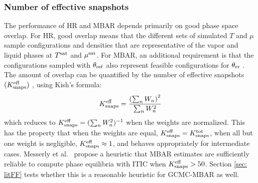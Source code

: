 \documentclass[journal=jced,manuscript=article]{achemso}
\begin{document}
\subsubsection{Number of effective snapshots} \label{sec: Keff}

The performance of HR and MBAR depends primarily on good phase space overlap. For HR, good overlap means that the different sets of simulated $T$ and $\mu$ sample configurations and densities that are representative of the vapor and liquid phases at $T^{\rm sat}$ and $\mu^{\rm sat}$. For MBAR, an additional requirement is that the configurations sampled with $\theta_{\rm ref}$ also represent feasible configurations for $\theta_{\rm rr}$ \cite{naden:jctc:2016,Postdoc_1}. The amount of overlap can be quantified by the number of effective snapshots $(K^{\rm eff}_{\rm snaps})$ \cite{Dybeck2016}, using Kish's formula:
\begin{eqnarray} \label{Neff_lit}
K^{\rm eff}_{\rm snaps} = \frac{\left(\sum_n W_n\right)^2}{\sum_n W_n^2}
\end{eqnarray}
which reduces to $K^{\rm eff}_{\rm snaps}  = (\sum_n W_n^2)^{-1}$ when the weights are
normalized. This has the property that when the weights are equal,
$K^{\rm eff}_{\rm snaps}  = K^{\rm tot}_{\rm snaps} $, when all but one weight is negligible, $K^{\rm eff}_{\rm snaps}  \approx
1$, and behaves appropriately for intermediate cases. Messerly et al.~\cite{Postdoc_1} propose a heuristic that MBAR estimates are sufficiently reliable to compute phase equilibria with ITIC when $K^{\rm eff}_{\rm snaps} > 50$. Section \ref{sec: litFF} tests whether this is a reasonable heuristic for GCMC-MBAR as well. 
\end{document}

